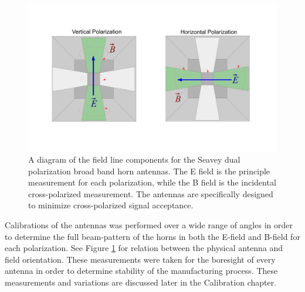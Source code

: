 	
\begin{figure}
\centering
	\includegraphics[width=\textwidth]{figures/AntennaPol}
	\caption{A diagram of the field line components for the Seavey dual polarization broad band horn antennas.  The E field is the principle measurement for each polarization, while the B field is the incidental cross-polarized measurement.  The antennas are specifically designed to minimize cross-polarized signal acceptance.}
	\label{fig:AntennaPol}
\end{figure}

	
	
	Calibrations of the antennas was performed over a wide range of angles in order to determine the full beam-pattern of the horns in both the E-field and B-field for each polarization. See Figure \ref{fig:AntennaPol} for relation between the physical antenna and field orientation.  These measurements were taken for the boresight of every antenna in order to determine stability of the manufacturing process.  These measurements and variations are discussed later in the Calibration chapter.
	

